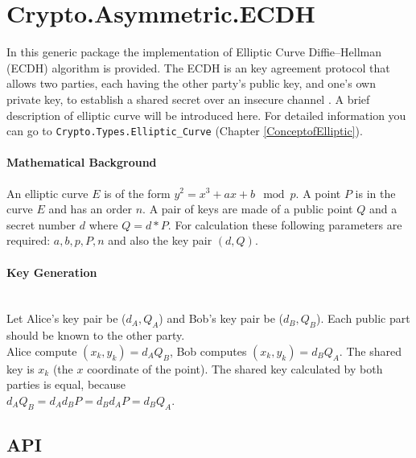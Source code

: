 \chapter{Crypto.Asymmetric.ECDH}\label{ECDH}
In this generic package the implementation of Elliptic Curve Diffie–Hellman (ECDH) algorithm is provided. The ECDH is an key agreement protocol that allows two parties, each having the other party's public key, and one's own private key, to establish a shared secret over an insecure channel \cite{ECDH-NIST}. A brief description of elliptic curve will be introduced here. For detailed information you can go to \texttt{Crypto.Types.Elliptic\_Curve} (Chapter \ref{ConceptofElliptic}).
\subsubsection*{Mathematical Background}
An elliptic curve $E$ is of the form $y^2=x^3+ax+b\mod p$. A point $P$ is in the curve $E$ and has an order $n$. A pair of keys are made of a public point $Q$ and a secret number $d$ where $Q=d*P$. For calculation these following parameters are required: $a,b,p,P,n$ and also the key pair $(d,Q)$.
\subsubsection*{Key Generation}\\
Let Alice's key pair be ($d_A,Q_A$) and Bob's key pair be ($d_B,Q_B$). Each public part should be known to the other party.\\
Alice compute $(x_k,y_k)=d_AQ_B$, Bob computes $(x_k,y_k)=d_BQ_A$. The shared key is $x_k$ (the $x$ coordinate of the point). The shared key calculated by both parties is equal, because\\ $d_AQ_B=d_Ad_BP=d_Bd_AP=d_BQ_A$.
\section{API}
